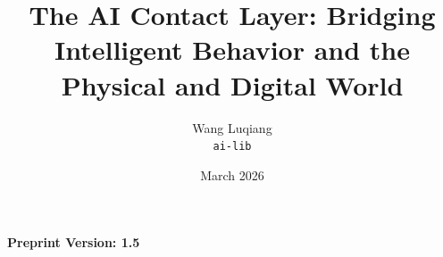 \documentclass[11pt,a4paper]{article}
\title{The AI Contact Layer: Bridging Intelligent Behavior and the Physical and Digital World}
\author{
  Wang Luqiang\\
  \texttt{ai-lib}
}
\date{March 2026}
\begin{document}

\maketitle

\begin{center}
\textbf{Preprint Version: 1.5}
\end{center}


















\end{document}
